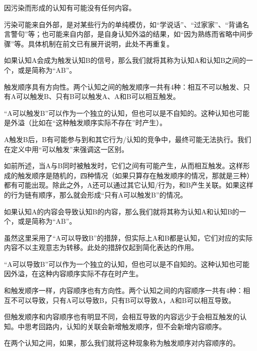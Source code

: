 因污染而形成的认知有可能没有任何内容。
\begin{explain}
污染可能来自外部，是对某些行为的单纯模仿，如“学说话”、“过家家”、“背诵名言警句”等；也可能来自内部，是自身认知外溢的结果，如“因为熟练而省略中间步骤”等。具体机制在前文已有展开说明，此处不再重复。
\end{explain}

如果认知A会成为触发认知B的信号，那么我们就将其称为认知A和认知B之间的一个，或是简称为“AB”。
\begin{explain}
触发顺序具有方向性。两个认知之间的触发顺序一共有4种：相互不可以触发、只有A可以触发B、只有B可以触发A、A和B可以相互触发。

“A可以触发B”可以作为一个独立的认知，但也可以是不自知的。这种认知也可能是外溢（比如在“这种触发顺序实际不存在”时产生）。

A触发B后，B有可能参与到和其它行为/认知的竞争中，最终可能无法执行。我们在定义中用“可以触发”来强调这一区别。

如前所述，当A与B同时被触发时，它们之间有可能产生，从而相互触发。这样形成的触发顺序是随机的，四种情况（如果只算存在触发顺序的情况，那就是三种）都有可能出现。除此之外，A还可以通过其它认知/行为，和B产生关联。如果这样的行为链有顺序，那么就会形成“只有A可以触发B”的情况。
\end{explain}
如果认知A的内容会导致认知B的内容，那么我们就将其称为认知A和认知B的一个，或是简称为“AB”。
\begin{explain}
虽然这里采用了“A可以导致B”的措辞，但实际上A和B都是认知，它们对应的实际内容不以主观意志为转移。此处的措辞仅起到简化表达的作用。

“A可以导致B”可以作为一个独立的认知，但也可以是不自知的。这种认知也可能因外溢，在这种内容顺序实际不存在时产生。

和触发顺序一样，内容顺序也有方向性。两个认知之间的内容顺序一共有4种：相互不可以导致，只有A可以导致B，只有B可以导致A，A和B可以相互导致。

但触发顺序和内容顺序也有明显不同，会相互导致的内容远少于会相互触发的认知。中思考回路内，认知的关联会新增触发顺序，但不会新增内容顺序。
\end{explain}
在两个认知之间，如果，那么我们就将这种现象称为触发顺序对内容顺序的。
